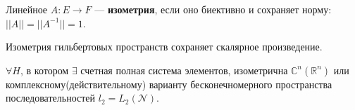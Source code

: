 \begin{to_def}
	Линейное $A\colon E \to F$ --- \textbf{изометрия}, если оно биективно и сохраняет норму: $||A|| = ||A^{-1}|| = 1$.
\end{to_def}

\begin{to_lem}
	Изометрия гильбертовых пространств сохраняет скалярное произведение.
\end{to_lem}

\begin{to_thr}
	$\forall H$, в котором $\exists$ счетная полная система элементов, изометрична $\mathbb{C}^n (\mathbb{R}^n)$ или комплексному(действительному) варианту бесконечномерного пространства последовательностей $l_2 = L_2(\mathcal{N})$.
\end{to_thr}